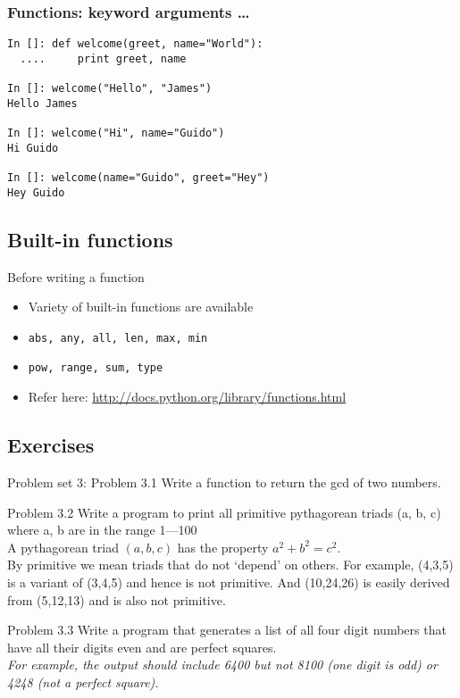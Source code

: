 \documentclass[14pt,compress]{beamer}
\newcounter{time}
\newcommand{\inctime}[1]{\addtocounter{time}{#1}{\tiny \thetime\ m}}
\newcommand{\typ}[1]{\lstinline{#1}}
\begin{document}
\begin{frame}[fragile]
  \frametitle{Functions: keyword arguments \ldots}
  \begin{lstlisting}
In []: def welcome(greet, name="World"):
  ....     print greet, name

In []: welcome("Hello", "James")
Hello James

In []: welcome("Hi", name="Guido")
Hi Guido

In []: welcome(name="Guido", greet="Hey")
Hey Guido
  \end{lstlisting}
\end{frame}

\subsection{Built-in functions}
\begin{frame}
  {Before writing a function}
  \begin{itemize}
      \item Variety of built-in functions are available
      \item \typ{abs, any, all, len, max, min}
      \item \typ{pow, range, sum, type}
      \item Refer here:
          \url{http://docs.python.org/library/functions.html}
  \end{itemize}
  \inctime{10} 
\end{frame}

\subsection{Exercises}
\begin{frame}{Problem set 3: Problem 3.1}
  Write a function to return the gcd of two numbers.
\end{frame}

\begin{frame}{Problem 3.2}
Write a program to print all primitive pythagorean triads (a, b, c) where a, b are in the range 1---100 \\
A pythagorean triad $(a,b,c)$ has the property $a^2 + b^2 = c^2$.\\By primitive we mean triads that do not `depend' on others. For example, (4,3,5) is a variant of (3,4,5) and hence is not primitive. And (10,24,26) is easily derived from (5,12,13) and is also not primitive.
\end{frame}

\begin{frame}{Problem 3.3}
  Write a program that generates a list of all four digit numbers that have all their digits even and are perfect squares.\newline\\\emph{For example, the output should include 6400 but not 8100 (one digit is odd) or 4248 (not a perfect square).}

\inctime{15}
\end{frame}
\end{document}
